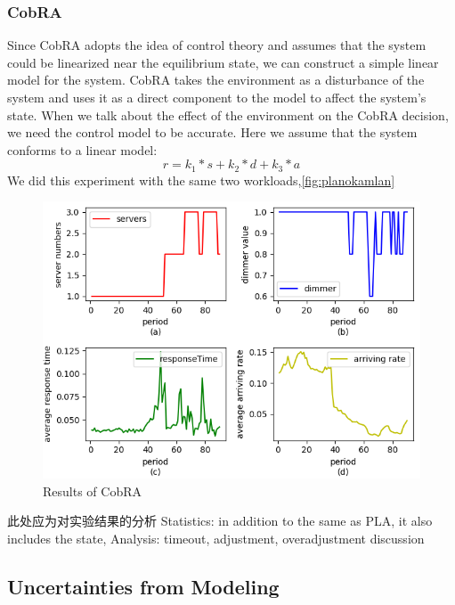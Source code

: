\documentclass[sigconf]{acmart}
\begin{document}
\subsubsection{CobRA}
Since CobRA adopts the idea of control theory and assumes that the system could be linearized near the equilibrium state, we can construct a simple linear model for the system. CobRA takes the environment as a disturbance of the system and uses it as a direct component to the model to affect the system's state. When we talk about the effect of the environment on the CobRA decision, we need the control model to be accurate. Here we assume that the system conforms to a linear model:
\begin{equation}
r=k_1*s+k_2*d+k_3*a
\end{equation}
We did this experiment with the same two workloads,\ref{fig:planokamlan}
\begin{figure}[h]
	\centering
	\includegraphics[width=\linewidth]{qkwc}
	\caption{Results of CobRA}
	
\end{figure}
此处应为对实验结果的分析
Statistics: in addition to the same as PLA, it also includes the state,
Analysis: timeout, adjustment, overadjustment discussion
\subsection{Uncertainties from Modeling}
\end{document}
